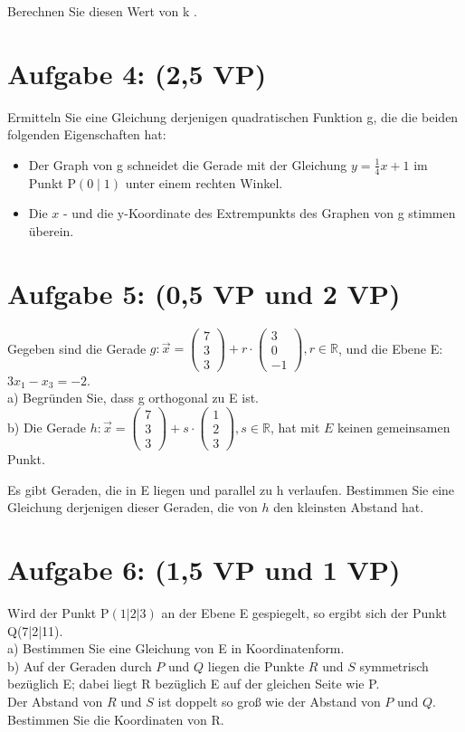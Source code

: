 \documentclass[10pt]{article}
\begin{document}
Berechnen Sie diesen Wert von k .

\section*{Aufgabe 4: (2,5 VP)}
Ermitteln Sie eine Gleichung derjenigen quadratischen Funktion g, die die beiden folgenden Eigenschaften hat:

\begin{itemize}
  \item Der Graph von g schneidet die Gerade mit der Gleichung $y=\frac{1}{4} x+1$ im Punkt $\mathrm{P}(0 \mid 1)$ unter einem rechten Winkel.
  \item Die $x$ - und die y-Koordinate des Extrempunkts des Graphen von g stimmen überein.
\end{itemize}

\section*{Aufgabe 5: (0,5 VP und 2 VP)}
Gegeben sind die Gerade $g: \vec{x}=\left(\begin{array}{l}7 \\ 3 \\ 3\end{array}\right)+r \cdot\left(\begin{array}{c}3 \\ 0 \\ -1\end{array}\right), r \in \mathbb{R}$, und die Ebene E: $3 x_{1}-x_{3}=-2$.\\
a) Begründen Sie, dass g orthogonal zu E ist.\\
b) Die Gerade $h: \vec{x}=\left(\begin{array}{l}7 \\ 3 \\ 3\end{array}\right)+s \cdot\left(\begin{array}{l}1 \\ 2 \\ 3\end{array}\right), s \in \mathbb{R}$, hat mit $E$ keinen gemeinsamen Punkt.

Es gibt Geraden, die in E liegen und parallel zu h verlaufen. Bestimmen Sie eine Gleichung derjenigen dieser Geraden, die von $h$ den kleinsten Abstand hat.

\section*{Aufgabe 6: (1,5 VP und 1 VP)}
Wird der Punkt $\mathrm{P}(1|2| 3)$ an der Ebene E gespiegelt, so ergibt sich der Punkt Q(7|2|11).\\
a) Bestimmen Sie eine Gleichung von E in Koordinatenform.\\
b) Auf der Geraden durch $P$ und $Q$ liegen die Punkte $R$ und $S$ symmetrisch bezüglich E; dabei liegt R bezüglich E auf der gleichen Seite wie P.\\
Der Abstand von $R$ und $S$ ist doppelt so groß wie der Abstand von $P$ und $Q$. Bestimmen Sie die Koordinaten von R.
\end{document}
